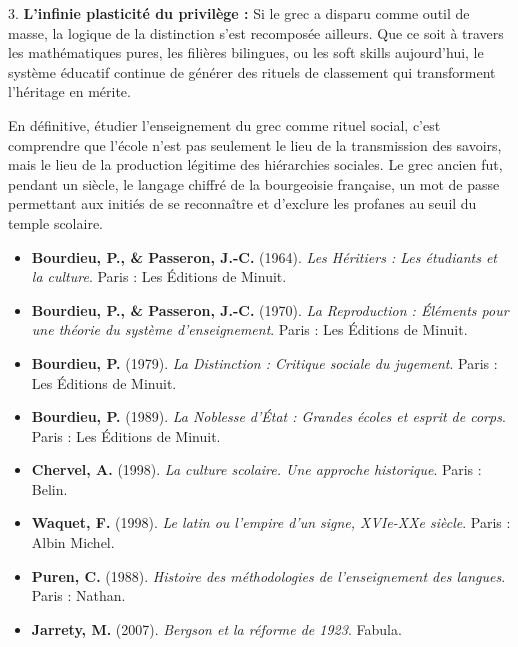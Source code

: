 3. \textbf{L'infinie plasticité du privilège :} Si le grec a disparu comme outil de masse, la
logique de la distinction s'est recomposée ailleurs. Que ce soit à travers les mathématiques pures,
les filières bilingues, ou les \og soft skills\fg{} aujourd'hui, le système éducatif continue de
générer des \og rituels de classement\fg{} qui transforment l'héritage en mérite.

En définitive, étudier l'enseignement du grec comme \og rituel social\fg{}, c'est comprendre que
l'école n'est pas seulement le lieu de la transmission des savoirs, mais le lieu de la production
légitime des hiérarchies sociales. Le grec ancien fut, pendant un siècle, le langage chiffré de la
bourgeoisie française, un mot de passe permettant aux initiés de se reconnaître et d'exclure les
profanes au seuil du temple scolaire.

\begin{itemize}\item \textbf{Bourdieu, P., \& Passeron, J.-C.} (1964). \textit{Les Héritiers : Les étudiants et la culture}. Paris : Les Éditions de Minuit.\cite{I-2-3-ref1}\item \textbf{Bourdieu, P., \& Passeron, J.-C.} (1970). \textit{La Reproduction : Éléments pour une théorie du système d'enseignement}. Paris : Les Éditions de Minuit.\cite{I-2-3-ref11}\item \textbf{Bourdieu, P.} (1979). \textit{La Distinction : Critique sociale du jugement}. Paris : Les Éditions de Minuit.\cite{I-2-3-ref7}\item \textbf{Bourdieu, P.} (1989). \textit{La Noblesse d'État : Grandes écoles et esprit de corps}. Paris : Les Éditions de Minuit.\cite{I-2-3-ref10}\item \textbf{Chervel, A.} (1998). \textit{La culture scolaire. Une approche historique}. Paris : Belin.\cite{I-2-3-ref3}\item \textbf{Waquet, F.} (1998). \textit{Le latin ou l'empire d'un signe, XVIe-XXe siècle}. Paris : Albin Michel.\cite{I-2-3-ref5}\item \textbf{Puren, C.} (1988). \textit{Histoire des méthodologies de l'enseignement des langues}. Paris : Nathan.\cite{I-2-3-ref19}\item \textbf{Jarrety, M.} (2007). \textit{Bergson et la réforme de 1923}. Fabula.\cite{I-2-3-ref17}\end{itemize}